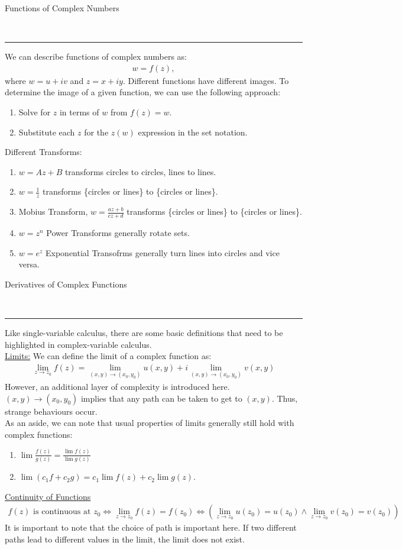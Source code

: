 \documentclass{article}
\newcommand{\header}[1]{\begin{large}\noindent #1\end{large}\\\rule{\textwidth}{0.5pt}}
\newcommand{\gap}{\medskip\\}
\newcommand{\sheader}[1]{\underline{#1:}}
\newcommand{\ds}{\displaystyle}
\begin{document}
    \header{Functions of Complex Numbers}

    We can describe functions of complex numbers as:
    \begin{align*}
        w = f(z),
    \end{align*}
    where $w = u + iv$ and $z = x + iy$. Different functions have different images.
    To determine the image of a given function, we can use the following approach:
    \begin{enumerate}
        \item Solve for $z$ in terms of $w$ from $f(z) = w$.
        \item Substitute each $z$ for the $z(w)$ expression in the set notation.
    \end{enumerate}
    \pagebreak
    Different Transforms:
    \begin{enumerate}
        \item $w = Az + B$ transforms circles to circles, lines to lines.
        \item $w = \frac{1}{z}$ transforms \{circles or lines\} to \{circles or lines\}.
        \item Mobius Transform, $w = \frac{az + b}{cz + d}$ transforms \{circles or lines\} to \{circles or lines\}.
        \item $w = z^n$ Power Transforms generally rotate sets.
        \item $w = e^z$ Exponential Transofrms generally turn lines into circles and vice versa.
    \end{enumerate}

    \header{Derivatives of Complex Functions}
    Like single-variable calculus, there are some basic definitions that need to 
    be highlighted in complex-variable calculus.
    \gap
    \sheader{Limits}
    We can define the limit of a complex function as:
    \begin{align*}
        \lim_{z \to z_0} f(z) = \lim_{(x, y) \to (x_0, y_0)}u(x, y) + i \lim_{(x, y) \to (x_0, y_0)}v(x, y)
    \end{align*}
    However, an additional layer of complexity is introduced here. $(x, y) \to (x_0, y_0)$
    implies that any path can be taken to get to $(x,y)$. Thus, strange behaviours occur.
    \gap
    As an aside, we can note that usual properties of limits generally still hold 
    with complex functions:
    \begin{enumerate}
        \item $\ds \lim \frac{f(z)}{g(z)} = \frac{\lim f(z)}{\lim g(z)}$
        \item $\lim(c_1 f + c_2 g) = c_1 \lim f(z) + c_2 \lim g(z)$.
    \end{enumerate}
    \underline{Continuity of Functions}
    \begin{align*}
        f(z) \textrm{ is continuous at }z_0 \iff \lim_{z \to z_0} f(z) = f(z_0) \iff \left(\lim_{z \to z_0} u(z_0) = u(z_0) \wedge \lim_{z \to z_0} v(z_0) = v(z_0)\right)
    \end{align*}
    It is important to note that the choice of path is important here. 
    If two different paths lead to different values in the limit, the limit does not 
    exist.
    
\end{document}
